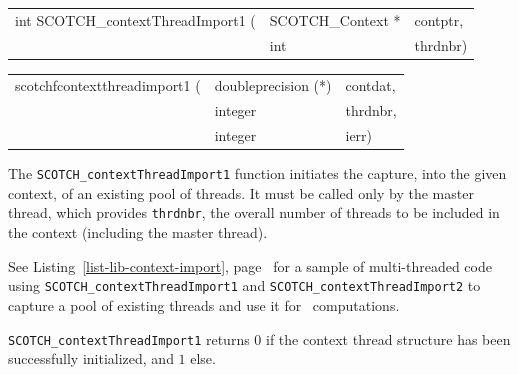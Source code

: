 \begin{itemize}
\progsyn

{\tt\begin{tabular}{l@{}ll}
int SCOTCH\_contextThreadImport1 ( & SCOTCH\_Context * & contptr, \\
                                   & int               & thrdnbr)
\end{tabular}}

{\tt\begin{tabular}{l@{}ll}
scotchfcontextthreadimport1 ( & doubleprecision (*) & contdat, \\
                              & integer             & thrdnbr, \\
                              & integer             & ierr)
\end{tabular}}

\progdes

The \texttt{SCOTCH\_contextThreadImport1} function initiates the
capture, into the given context, of an existing pool of threads. It
must be called only by the master thread, which provides
\texttt{thrdnbr}, the overall number of threads to be included in the
context (including the master thread).

See Listing~\ref{list-lib-context-import},
page~\pageref{list-lib-context-import} for a sample of multi-threaded
code using \texttt{SCOTCH\_\lbt context\lbt Thread\lbt Import1} and
\texttt{SCOTCH\_\lbt context\lbt Thread\lbt Import2} to capture a pool
of existing threads and use it for \libscotch\ computations.

\progret

\texttt{SCOTCH\_contextThreadImport1} returns $0$ if the context
thread structure has been successfully initialized, and $1$ else.
\end{itemize}

